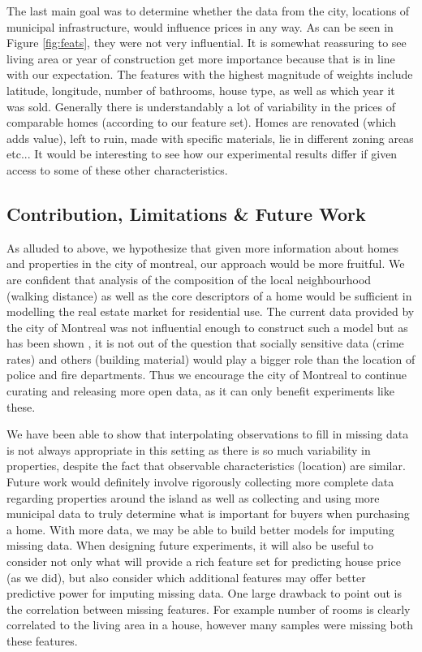 \documentclass{acm_proc_article-sp}
\begin{document}
	The last main goal was to determine whether the data from the city, locations of municipal infrastructure, would influence prices in any way. As can be seen in Figure \ref{fig:feats}, they were not very influential. It is somewhat reassuring to see living area or year of construction get more importance because that is in line with our expectation. The features with the highest magnitude of weights include latitude, longitude, number of bathrooms, house type, as well as which year it was sold. Generally there is understandably a lot of variability in the prices of comparable homes (according to our feature set). Homes are renovated (which adds value), left to ruin, made with specific materials, lie in different zoning areas etc... It would be interesting to see how our experimental results differ if given access to some of these other characteristics. 
	
\subsection{Contribution, Limitations \& Future Work}
	As alluded to above, we hypothesize that given more information about homes and properties in the city of montreal, our approach would be more fruitful. We are confident that analysis of the composition of the local neighbourhood (walking distance) as well as the core descriptors of a home would be sufficient in modelling the real estate market for residential use. The current data provided by the city of Montreal was not influential enough to construct such a model but as has been shown \cite{bostonres}, it is not out of the question that socially sensitive data (crime rates) and others (building material) would play a bigger role than the location of police and fire departments. Thus we encourage the city of Montreal to continue curating and releasing more open data, as it can only benefit experiments like these.
	
	We have been able to show that interpolating observations to fill in missing data is not always appropriate in this setting as there is so much variability in properties, despite the fact that observable characteristics (location) are similar. Future work would definitely involve rigorously collecting more complete data regarding properties around the island as well as collecting and using more municipal data to truly determine what is important for buyers when purchasing a home. With more data, we may be able to build better models for imputing missing data. When designing future experiments, it will also be useful to consider not only what will provide a rich feature set for predicting house price (as we did), but also consider which additional features may offer better predictive power for imputing missing data. One large drawback to point out is the correlation between missing features. For example number of rooms is clearly correlated to the living area in a house, however many samples were missing both these features.
	
\end{document}
